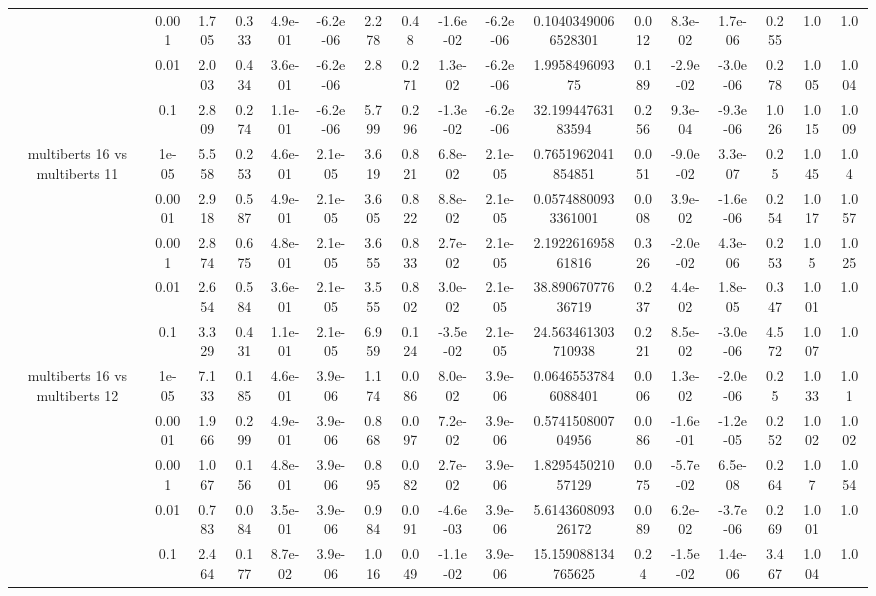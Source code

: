 \begin{tabular}{|c|c|c|c|c|c|c|c|c|c|c|c|c|c|c|c|c|}
 & 0.001 & 1.705 & 0.333 & 4.9e-01 & -6.2e-06 & 2.278 & 0.48 & -1.6e-02 & -6.2e-06 & 0.10403490066528301 & 0.012 & 8.3e-02 & 1.7e-06 & 0.255 & 1.0 & 1.0 \\
 & 0.01 & 2.003 & 0.434 & 3.6e-01 & -6.2e-06 & 2.8 & 0.271 & 1.3e-02 & -6.2e-06 & 1.995849609375 & 0.189 & -2.9e-02 & -3.0e-06 & 0.278 & 1.005 & 1.004 \\
 & 0.1 & 2.809 & 0.274 & 1.1e-01 & -6.2e-06 & 5.799 & 0.296 & -1.3e-02 & -6.2e-06 & 32.19944763183594 & 0.256 & 9.3e-04 & -9.3e-06 & 1.026 & 1.015 & 1.009 \\
\hline
\multirow{5}{*}{multiberts 16 vs multiberts 11} & 1e-05 & 5.558 & 0.253 & 4.6e-01 & 2.1e-05 & 3.619 & 0.821 & 6.8e-02 & 2.1e-05 & 0.7651962041854851 & 0.051 & -9.0e-02 & 3.3e-07 & 0.25 & 1.045 & 1.04 \\
 & 0.0001 & 2.918 & 0.587 & 4.9e-01 & 2.1e-05 & 3.605 & 0.822 & 8.8e-02 & 2.1e-05 & 0.05748800933361001 & 0.008 & 3.9e-02 & -1.6e-06 & 0.254 & 1.017 & 1.057 \\
 & 0.001 & 2.874 & 0.675 & 4.8e-01 & 2.1e-05 & 3.655 & 0.833 & 2.7e-02 & 2.1e-05 & 2.192261695861816 & 0.326 & -2.0e-02 & 4.3e-06 & 0.253 & 1.05 & 1.025 \\
 & 0.01 & 2.654 & 0.584 & 3.6e-01 & 2.1e-05 & 3.555 & 0.802 & 3.0e-02 & 2.1e-05 & 38.89067077636719 & 0.237 & 4.4e-02 & 1.8e-05 & 0.347 & 1.001 & 1.0 \\
 & 0.1 & 3.329 & 0.431 & 1.1e-01 & 2.1e-05 & 6.959 & 0.124 & -3.5e-02 & 2.1e-05 & 24.563461303710938 & 0.221 & 8.5e-02 & -3.0e-06 & 4.572 & 1.007 & 1.0 \\
\hline
\multirow{5}{*}{multiberts 16 vs multiberts 12} & 1e-05 & 7.133 & 0.185 & 4.6e-01 & 3.9e-06 & 1.174 & 0.086 & 8.0e-02 & 3.9e-06 & 0.06465537846088401 & 0.006 & 1.3e-02 & -2.0e-06 & 0.25 & 1.033 & 1.01 \\
 & 0.0001 & 1.966 & 0.299 & 4.9e-01 & 3.9e-06 & 0.868 & 0.097 & 7.2e-02 & 3.9e-06 & 0.574150800704956 & 0.086 & -1.6e-01 & -1.2e-05 & 0.252 & 1.002 & 1.002 \\
 & 0.001 & 1.067 & 0.156 & 4.8e-01 & 3.9e-06 & 0.895 & 0.082 & 2.7e-02 & 3.9e-06 & 1.829545021057129 & 0.075 & -5.7e-02 & 6.5e-08 & 0.264 & 1.07 & 1.054 \\
 & 0.01 & 0.783 & 0.084 & 3.5e-01 & 3.9e-06 & 0.984 & 0.091 & -4.6e-03 & 3.9e-06 & 5.614360809326172 & 0.089 & 6.2e-02 & -3.7e-06 & 0.269 & 1.001 & 1.0 \\
 & 0.1 & 2.464 & 0.177 & 8.7e-02 & 3.9e-06 & 1.016 & 0.049 & -1.1e-02 & 3.9e-06 & 15.159088134765625 & 0.24 & -1.5e-02 & 1.4e-06 & 3.467 & 1.004 & 1.0 \\

\end{tabular}
